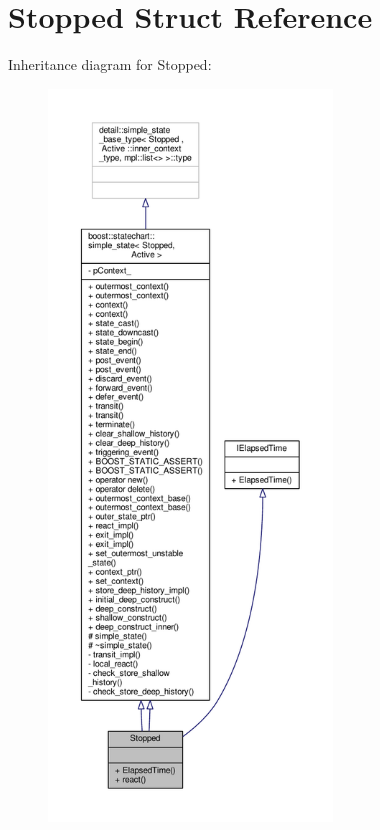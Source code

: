 \hypertarget{struct_stopped}{}\section{Stopped Struct Reference}
\label{struct_stopped}


Inheritance diagram for Stopped\+:
\nopagebreak
\begin{figure}[H]
\begin{center}
\leavevmode
\includegraphics[height=550pt]{struct_stopped__inherit__graph}
\end{center}
\end{figure}



